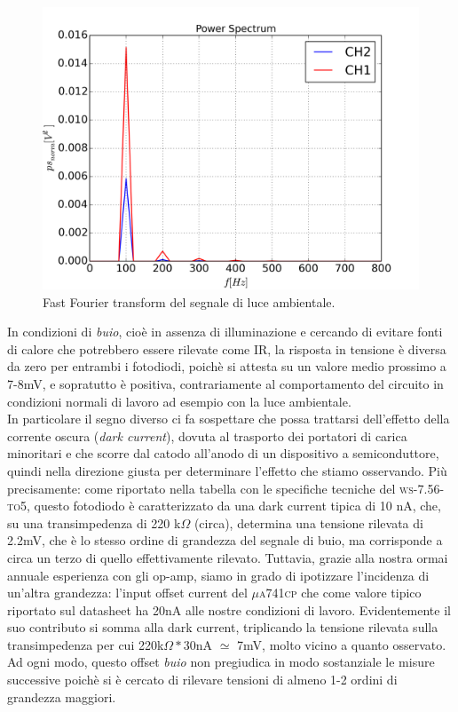 \documentclass[10pt,letterpaper]{article}
\begin{document}
\begin{figure}
\centering
\includegraphics[width=0.7\linewidth]{./fft_lucestanza}
\caption{Fast Fourier transform del segnale di luce ambientale.}
\label{fig:fft_lucestanza}
\end{figure}


In condizioni di \textit{buio}, cioè in assenza di illuminazione e cercando di evitare fonti di calore che potrebbero essere rilevate come IR, la risposta in tensione è diversa da zero per entrambi i fotodiodi, poichè si attesta su un valore medio prossimo a 7-8mV, e sopratutto è positiva, contrariamente al comportamento del circuito in condizioni normali di lavoro ad esempio con la luce ambientale.\\
In particolare il segno diverso ci fa sospettare che possa trattarsi dell'effetto della corrente oscura (\textit{dark current}), dovuta al trasporto dei portatori di carica minoritari e che scorre dal catodo all'anodo di un dispositivo a semiconduttore, quindi nella direzione giusta per determinare l'effetto che stiamo osservando. Più precisamente: come riportato nella tabella con le specifiche tecniche del \textsc{ws-7.56-to5}, questo fotodiodo è caratterizzato da una dark current tipica di 10 nA, che, su una transimpedenza di 220 k$\Omega$ (circa), determina una tensione rilevata di 2.2mV, che è lo stesso ordine di grandezza del segnale di buio, ma corrisponde a circa un terzo di quello effettivamente rilevato. Tuttavia, grazie alla nostra ormai annuale esperienza con gli op-amp, siamo in grado di ipotizzare l'incidenza di un'altra grandezza: l'input offset current del \textsc{$\mu$a741cp} che come valore tipico riportato sul datasheet ha 20nA alle nostre condizioni di lavoro. Evidentemente il suo contributo si somma alla dark current, triplicando la tensione rilevata sulla transimpedenza per cui 220k$\Omega*30$nA $\simeq$ 7mV, molto vicino a quanto osservato.\\
Ad ogni modo, questo offset \textit{buio} non pregiudica in modo sostanziale le misure successive poichè si è cercato di rilevare tensioni di almeno 1-2 ordini di grandezza maggiori.\\
\end{document}
